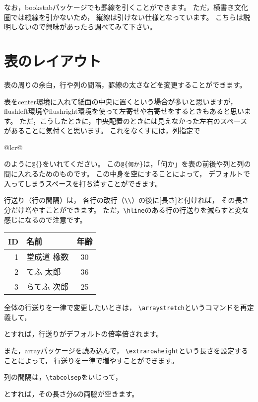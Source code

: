 なお，bookstabパッケージでも罫線を引くことができます。
ただ，横書き文化圏では縦線を引かないため，
縦線は引けない仕様となっています。
こちらは説明しないので興味があったら調べてみて下さい。



\section{表のレイアウト}
表の周りの余白，行や列の間隔，罫線の太さなどを変更することができます。

表をcenter環境に入れて紙面の中央に置くという場合が多いと思いますが，
flushleft環境やflushright環境を使って左寄せや右寄せをするときもあると思います。
ただ，こうしたときに，中央配置のときには見えなかった左右のスペースがあることに気付くと思います。
これをなくすには，列指定で
\begin{ITeX}
{@{}lcr@{}}
\end{ITeX}
のように\verb|@{}|をいれてください。
この\verb|@{何か}|は，「何か」を表の前後や列と列の間に入れるためのものです。
この中身を空にすることによって，
デフォルトで入ってしまうスペースを打ち消すことができます。

行送り（行の間隔）は，
各行の改行（\verb|\\|）の後に[長さ]と付ければ，
その長さ分だけ増やすことができます。
ただ，\verb|\hline|のある行の行送りを減らすと変な感じになるので注意です。
\begin{IOTeX}
\begin{tabular}{|r|l|c|} \hline
ID & 名前 & 年齢 \\ \hline
1 & 堂成道 橡数 & 30 \\ [10pt]
2 & てふ 太郎 & 36 \\
3 & らてふ 次郎 & 25 \\ \hline
\end{tabular}
\end{IOTeX}

全体の行送りを一律で変更したいときは，
\verb|\arraystretch|というコマンドを再定義して，
\begin{ITeX}
\renewcommand{\arrastretch}{倍率}
\end{ITeX}
とすれば，行送りがデフォルトの倍率倍されます。

また，arrayパッケージを読み込んで，
\verb|\extrarowheight|という長さを設定することによって，
行送りを一律で増やすことができます。
\begin{ITeX}
\setlength{\extrarowheight}{長さ}
\end{ITeX}

列の間隔は，\verb|\tabcolsep|をいじって，
\begin{ITeX}
\setlength{\tabcolsep}{長さ}
\end{ITeX}
とすれば，その長さ分\verb|&|の両脇が空きます。

